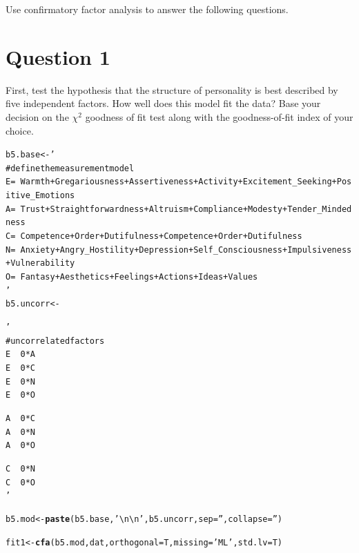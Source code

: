 \documentclass{article}\usepackage[]{graphicx}\usepackage[]{color}
\makeatletter
\newcommand{\hlstr}[1]{\textcolor[rgb]{0.192,0.494,0.8}{#1}}%
\newcommand{\hlstd}[1]{\textcolor[rgb]{0.345,0.345,0.345}{#1}}%
\newcommand{\hlkwb}[1]{\textcolor[rgb]{0.69,0.353,0.396}{#1}}%
\newcommand{\hlkwc}[1]{\textcolor[rgb]{0.333,0.667,0.333}{#1}}%
\newcommand{\hlkwd}[1]{\textcolor[rgb]{0.737,0.353,0.396}{\textbf{#1}}}%
\newenvironment{kframe}{%
 \def\at@end@of@kframe{}%
 \ifinner\ifhmode%
  \def\at@end@of@kframe{\end{minipage}}%
  \begin{minipage}{\columnwidth}%
 \fi\fi%
 \def\FrameCommand##1{\hskip\@totalleftmargin \hskip-\fboxsep
 \colorbox{shadecolor}{##1}\hskip-\fboxsep
     \hskip-\linewidth \hskip-\@totalleftmargin \hskip\columnwidth}%
 \MakeFramed {\advance\hsize-\width
   \@totalleftmargin\z@ \linewidth\hsize
   \@setminipage}}%
 {\par\unskip\endMakeFramed%
 \at@end@of@kframe}
\newenvironment{knitrout}{}{} %
\makeatother
\begin{document}
Use confirmatory factor analysis to answer the following questions.  

\section{Question 1}
First, test the hypothesis that the structure of personality is best described by five independent factors. How well does this model fit the data? Base your decision on the $\chi^2$ goodness of fit test along with the goodness-of-fit index of your choice.  
\begin{knitrout}
\color{fgcolor}\begin{kframe}
\begin{alltt}
\hlstd{b5.base} \hlkwb{<-} \hlstr{'
# define the measurement model
E =~ Warmth + Gregariousness + Assertiveness + Activity + Excitement_Seeking + Positive_Emotions
A =~ Trust + Straightforwardness + Altruism + Compliance + Modesty + Tender_Mindedness
C =~ Competence + Order + Dutifulness + Competence + Order + Dutifulness
N =~ Anxiety + Angry_Hostility + Depression + Self_Consciousness + Impulsiveness + Vulnerability
O =~ Fantasy + Aesthetics + Feelings + Actions + Ideas + Values
'}
\hlstd{b5.uncorr} \hlkwb{<-}
\hlstr{'
# uncorrelated factors
E ~~ 0*A
E ~~ 0*C
E ~~ 0*N
E ~~ 0*O

A ~~ 0*C
A ~~ 0*N
A ~~ 0*O

C ~~ 0*N
C ~~ 0*O
'}

\hlstd{b5.mod} \hlkwb{<-} \hlkwd{paste}\hlstd{(b5.base,} \hlstr{'\textbackslash{}n\textbackslash{}n'}\hlstd{, b5.uncorr,} \hlkwc{sep} \hlstd{=} \hlstr{''}\hlstd{,} \hlkwc{collapse} \hlstd{=} \hlstr{''}\hlstd{)}

\hlstd{fit1} \hlkwb{<-} \hlkwd{cfa}\hlstd{(b5.mod, dat,} \hlkwc{orthogonal} \hlstd{= T,} \hlkwc{missing} \hlstd{=} \hlstr{'ML'}\hlstd{,} \hlkwc{std.lv} \hlstd{= T)}


\end{alltt}
\end{kframe}
\end{knitrout}
\end{document}
